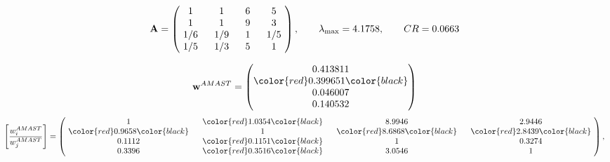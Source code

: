 \begin{example}
\begin{equation*}
\mathbf{A} =
\begin{pmatrix}
$\,\,$ 1 $\,\,$ & $\,\,$1$\,\,$ & $\,\,$6$\,\,$ & $\,\,$5 $\,\,$ \\
$\,\,$ 1 $\,\,$ & $\,\,$ 1 $\,\,$ & $\,\,$9$\,\,$ & $\,\,$3 $\,\,$ \\
$\,\,$ 1/6$\,\,$ & $\,\,$ 1/9$\,\,$ & $\,\,$ 1 $\,\,$ & $\,\,$ 1/5 $\,\,$ \\
$\,\,$ 1/5$\,\,$ & $\,\,$ 1/3$\,\,$ & $\,\,$5$\,\,$ & $\,\,$ 1  $\,\,$ \\
\end{pmatrix},
\qquad
\lambda_{\max} =
4.1758,
\qquad
CR = 0.0663
\end{equation*}

\begin{equation*}
\mathbf{w}^{AMAST} =
\begin{pmatrix}
0.413811\\
\color{red} 0.399651\color{black} \\
0.046007\\
0.140532
\end{pmatrix}\end{equation*}
\begin{equation*}
\left[ \frac{{w}^{AMAST}_i}{{w}^{AMAST}_j} \right] =
\begin{pmatrix}
$\,\,$ 1 $\,\,$ & $\,\,$\color{red} 1.0354\color{black} $\,\,$ & $\,\,$8.9946$\,\,$ & $\,\,$2.9446$\,\,$ \\
$\,\,$\color{red} 0.9658\color{black} $\,\,$ & $\,\,$ 1 $\,\,$ & $\,\,$\color{red} 8.6868\color{black} $\,\,$ & $\,\,$\color{red} 2.8439\color{black}   $\,\,$ \\
$\,\,$0.1112$\,\,$ & $\,\,$\color{red} 0.1151\color{black} $\,\,$ & $\,\,$ 1 $\,\,$ & $\,\,$0.3274 $\,\,$ \\
$\,\,$0.3396$\,\,$ & $\,\,$\color{red} 0.3516\color{black} $\,\,$ & $\,\,$3.0546$\,\,$ & $\,\,$ 1  $\,\,$ \\
\end{pmatrix},
\end{equation*}


\end{example}
